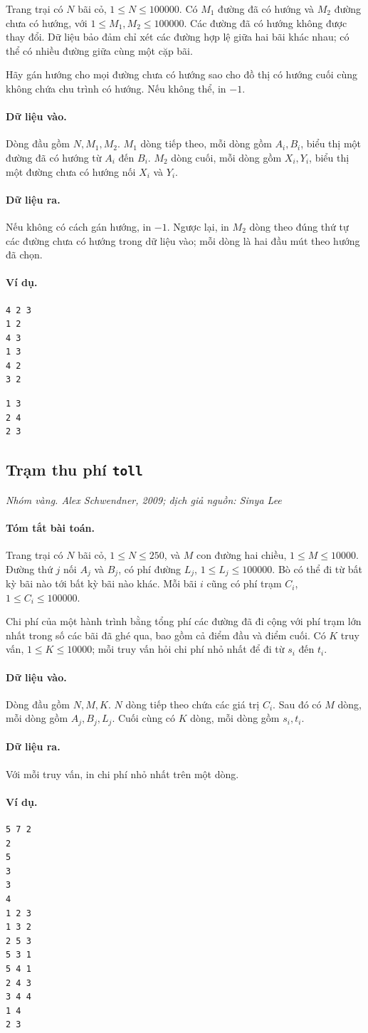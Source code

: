 \documentclass[11pt]{article}
\newcommand{\problem}[4]{%
  \subsection[#1 (#2)]{#1 \hfill {\normalsize\texttt{#2}}}%
  \noindent\textit{#3. #4}\par\smallskip
}
\newcommand{\iosec}[1]{\paragraph{#1}}
\begin{document}
Trang trại có \(N\) bãi cỏ, \(1\le N\le 100000\). Có \(M_1\) đường đã có
hướng và \(M_2\) đường chưa có hướng, với \(1\le M_1,M_2\le 100000\). Các
đường đã có hướng không được thay đổi. Dữ liệu bảo đảm chỉ xét các đường hợp
lệ giữa hai bãi khác nhau; có thể có nhiều đường giữa cùng một cặp bãi.

Hãy gán hướng cho mọi đường chưa có hướng sao cho đồ thị có hướng cuối cùng
không chứa chu trình có hướng. Nếu không thể, in \(-1\).

\iosec{Dữ liệu vào.}
Dòng đầu gồm \(N,M_1,M_2\). \(M_1\) dòng tiếp theo, mỗi dòng gồm
\(A_i,B_i\), biểu thị một đường đã có hướng từ \(A_i\) đến \(B_i\). \(M_2\)
dòng cuối, mỗi dòng gồm \(X_i,Y_i\), biểu thị một đường chưa có hướng nối
\(X_i\) và \(Y_i\).

\iosec{Dữ liệu ra.}
Nếu không có cách gán hướng, in \(-1\). Ngược lại, in \(M_2\) dòng theo đúng
thứ tự các đường chưa có hướng trong dữ liệu vào; mỗi dòng là hai đầu mút
theo hướng đã chọn.

\iosec{Ví dụ.}
\begin{verbatim}
4 2 3
1 2
4 3
1 3
4 2
3 2
\end{verbatim}

\begin{verbatim}
1 3
2 4
2 3
\end{verbatim}

\problem{Trạm thu phí}{toll}{Nhóm vàng}{Alex Schwendner, 2009; dịch giả nguồn: Sinya Lee}

\iosec{Tóm tắt bài toán.}
Trang trại có \(N\) bãi cỏ, \(1\le N\le 250\), và \(M\) con đường hai chiều,
\(1\le M\le 10000\). Đường thứ \(j\) nối \(A_j\) và \(B_j\), có phí đường
\(L_j\), \(1\le L_j\le 100000\). Bò có thể đi từ bất kỳ bãi nào tới bất kỳ
bãi nào khác. Mỗi bãi \(i\) cũng có phí trạm \(C_i\),
\(1\le C_i\le 100000\).

Chi phí của một hành trình bằng tổng phí các đường đã đi cộng với phí trạm
lớn nhất trong số các bãi đã ghé qua, bao gồm cả điểm đầu và điểm cuối. Có
\(K\) truy vấn, \(1\le K\le 10000\); mỗi truy vấn hỏi chi phí nhỏ nhất để đi
từ \(s_i\) đến \(t_i\).

\iosec{Dữ liệu vào.}
Dòng đầu gồm \(N,M,K\). \(N\) dòng tiếp theo chứa các giá trị \(C_i\). Sau đó
có \(M\) dòng, mỗi dòng gồm \(A_j,B_j,L_j\). Cuối cùng có \(K\) dòng, mỗi
dòng gồm \(s_i,t_i\).

\iosec{Dữ liệu ra.}
Với mỗi truy vấn, in chi phí nhỏ nhất trên một dòng.

\iosec{Ví dụ.}
\begin{verbatim}
5 7 2
2
5
3
3
4
1 2 3
1 3 2
2 5 3
5 3 1
5 4 1
2 4 3
3 4 4
1 4
2 3
\end{verbatim}
\end{document}
